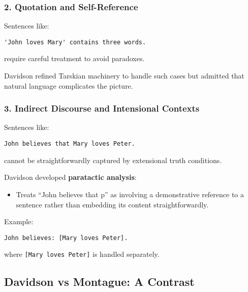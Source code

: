 \documentclass[12pt]{article}
\newcommand{\tightlist}{\itemsep 0pt\parskip 0pt\parsep 0pt}
\begin{document}
\hypertarget{quotation-and-self-reference}{%
\subsubsection{\texorpdfstring{2. \textbf{Quotation and
Self-Reference}}{2. Quotation and Self-Reference}}\label{quotation-and-self-reference}}

Sentences like:

\begin{verbatim}
'John loves Mary' contains three words.
\end{verbatim}

require careful treatment to avoid paradoxes.

Davidson refined Tarskian machinery to handle such cases but admitted
that natural language complicates the picture.

\hypertarget{indirect-discourse-and-intensional-contexts}{%
\subsubsection{\texorpdfstring{3. \textbf{Indirect Discourse and
Intensional
Contexts}}{3. Indirect Discourse and Intensional Contexts}}\label{indirect-discourse-and-intensional-contexts}}

Sentences like:

\begin{verbatim}
John believes that Mary loves Peter.
\end{verbatim}

cannot be straightforwardly captured by extensional truth conditions.

Davidson developed \textbf{paratactic analysis}:

\begin{itemize}
\tightlist
\item
  Treats ``John believes that p'' as involving a demonstrative reference
  to a sentence rather than embedding its content straightforwardly.
\end{itemize}

Example:

\begin{verbatim}
John believes: [Mary loves Peter].
\end{verbatim}

where \texttt{{[}Mary\ loves\ Peter{]}} is handled separately.

\hypertarget{davidson-vs-montague-a-contrast}{%
\subsection{Davidson vs Montague: A
Contrast}\label{davidson-vs-montague-a-contrast}}
\end{document}

